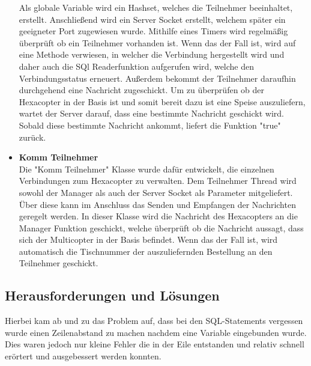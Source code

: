 \begin{itemize}
Als globale Variable wird ein Hashset, welches die Teilnehmer beeinhaltet, erstellt. 
Anschließend wird ein Server Socket erstellt, welchem später ein geeigneter Port zugewiesen wurde.
Mithilfe eines Timers wird regelmäßig überprüft ob ein Teilnehmer vorhanden ist. Wenn das der Fall ist, wird auf eine  Methode verwiesen, in welcher die Verbindung hergestellt wird und daher auch die SQl Readerfunktion aufgerufen wird, welche den Verbindungsstatus erneuert. Außerdem bekommt der Teilnehmer daraufhin durchgehend eine Nachricht zugeschickt.
Um zu überprüfen ob der Hexacopter in der Basis ist und somit bereit dazu ist eine Speise auszuliefern, wartet der Server darauf, dass eine bestimmte Nachricht geschickt wird. Sobald diese bestimmte Nachricht ankommt, liefert die Funktion "true" zurück.
    \item \textbf{Komm Teilnehmer}\\
Die "Komm Teilnehmer" Klasse wurde dafür entwickelt, die einzelnen Verbindungen zum Hexacopter zu verwalten.
Dem Teilnehmer Thread wird sowohl der Manager als auch der Server Socket als Parameter mitgeliefert. Über diese kann im Anschluss das Senden und Empfangen der Nachrichten geregelt werden. 
In dieser Klasse wird die Nachricht des Hexacopters an die Manager Funktion geschickt, welche überprüft ob die Nachricht aussagt, dass sich der Multicopter in der Basis befindet. Wenn das der Fall ist, wird automatisch die Tischnummer der auszuliefernden Bestellung an den Teilnehmer geschickt.
  \end{itemize}

  \subsection{Herausforderungen und Lösungen}
Hierbei kam ab und zu das Problem auf, dass bei den SQL-Statements vergessen wurde einen Zeilenabstand zu machen nachdem eine Variable eingebunden wurde. Dies waren jedoch nur kleine Fehler die in der Eile entstanden und relativ schnell erörtert und ausgebessert werden konnten.